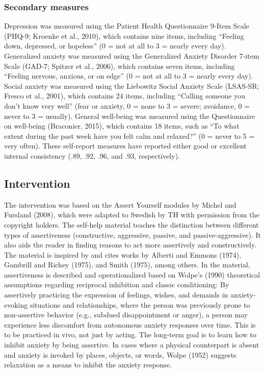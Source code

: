 \documentclass[preprint,
3p]{elsarticle} %
\begin{document}
\hypertarget{secondary-measures}{%
\subsubsection{Secondary measures}\label{secondary-measures}}

Depression was measured using the Patient Health Questionnaire 9-Item
Scale (PHQ-9; Kroenke et al., 2010), which contains nine items,
including ``Feeling down, depressed, or hopeless'' (0 = not at all to 3
= nearly every day). Generalized anxiety was measured using the
Generalized Anxiety Disorder 7-item Scale (GAD-7; Spitzer et al., 2006),
which contains seven items, including ``Feeling nervous, anxious, or on
edge'' (0 = not at all to 3 = nearly every day). Social anxiety was
measured using the Liebowitz Social Anxiety Scale (LSAS-SR; Fresco et
al., 2001), which contains 24 items, including ``Calling someone you
don't know very well'' (fear or anxiety, 0 = none to 3 = severe;
avoidance, 0 = never to 3 = usually). General well-being was measured
using the Questionnaire on well-being (Braconier, 2015), which contains
18 items, such as ``To what extent during the past week have you felt
calm and relaxed?'' (0 = never to 5 = very often). These self-report
measures have reported either good or excellent internal consistency
(\(.89\), \(.92\), \(.96\), and \(.93\), respectively).

\hypertarget{intervention}{%
\subsection{Intervention}\label{intervention}}

The intervention was based on the Assert Yourself modules by Michel and
Fursland (2008), which were adapted to Swedish by TH with permission
from the copyright holders. The self-help material teaches the
distinction between different types of assertiveness (constructive,
aggressive, passive, and passive-aggressive). It also aids the reader in
finding reasons to act more assertively and constructively. The material
is inspired by and cites works by Alberti and Emmons (1974), Gambrill
and Richey (1975), and Smith (1975), among others. In the material,
assertiveness is described and operationalized based on Wolpe's (1990)
theoretical assumptions regarding reciprocal inhibition and classic
conditioning: By assertively practicing the expression of feelings,
wishes, and demands in anxiety-evoking situations and relationships,
where the person was previously prone to non-assertive behavior (e.g.,
subdued disappointment or anger), a person may experience less
discomfort from autonomous anxiety responses over time. This is to be
practiced in vivo, not just by acting. The long-term goal is to learn
how to inhibit anxiety by being assertive. In cases where a physical
counterpart is absent and anxiety is invoked by places, objects, or
words, Wolpe (1952) suggests relaxation as a means to inhibit the
anxiety response.
\end{document}
